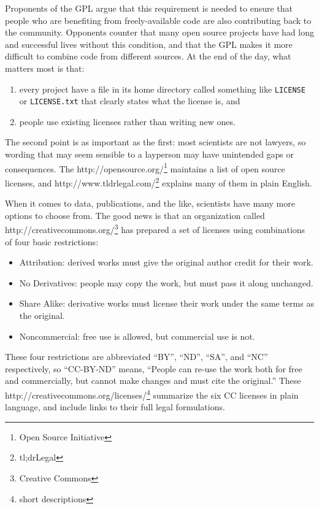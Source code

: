 \documentclass[]{book}
\newcommand{\urlfoot}[2]{{#1}\footnote{#2}}
\begin{document}
Proponents of the GPL argue that this requirement is needed to ensure
that people who are benefiting from freely-available code are also
contributing back to the community. Opponents counter that many open
source projects have had long and successful lives without this
condition, and that the GPL makes it more difficult to combine code from
different sources. At the end of the day, what matters most is that:

\begin{enumerate}
\item
  every project have a file in its home directory called something like
  \texttt{LICENSE} or \texttt{LICENSE.txt} that clearly states what the
  license is, and
\item
  people use existing licenses rather than writing new ones.
\end{enumerate}

The second point is as important as the first: most scientists are not
lawyers, so wording that may seem sensible to a layperson may have
unintended gaps or consequences. The \urlfoot{http://opensource.org/}{Open
Source Initiative} maintains a list of open source licenses, and
\urlfoot{http://www.tldrlegal.com/}{tl;drLegal} explains many of them in
plain English.

When it comes to data, publications, and the like, scientists have many
more options to choose from. The good news is that an organization
called \urlfoot{http://creativecommons.org/}{Creative Commons} has prepared
a set of licenses using combinations of four basic restrictions:

\begin{itemize}
\item
  Attribution: derived works must give the original author credit for
  their work.
\item
  No Derivatives: people may copy the work, but must pass it along
  unchanged.
\item
  Share Alike: derivative works must license their work under the same
  terms as the original.
\item
  Noncommercial: free use is allowed, but commercial use is not.
\end{itemize}

These four restrictions are abbreviated ``BY'', ``ND'', ``SA'', and
``NC'' respectively, so ``CC-BY-ND'' means, ``People can re-use the work
both for free and commercially, but cannot make changes and must cite
the original.'' These \urlfoot{http://creativecommons.org/licenses/}{short
descriptions} summarize the six CC licenses in plain language, and
include links to their full legal formulations.
\end{document}
